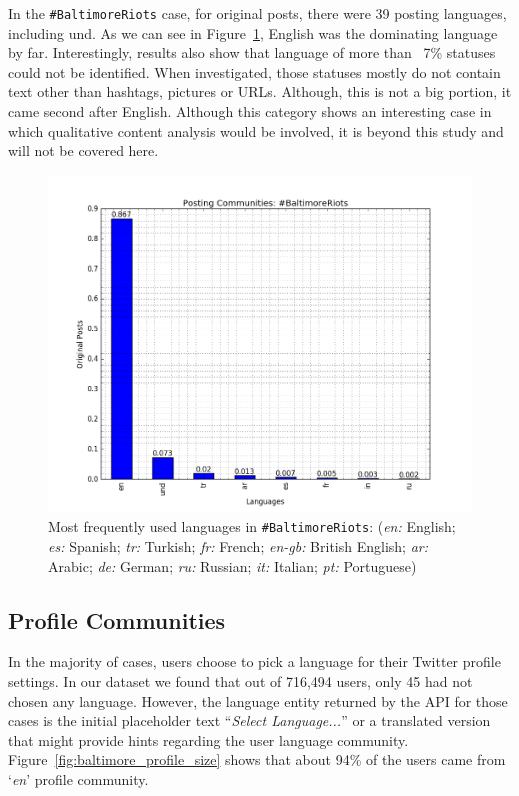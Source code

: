 In the {\texttt{\#BaltimoreRiots}} case, for original posts, there were 39 posting
languages, including und. As we can see in Figure~\ref{fig:baltimore_langfreq}, English was the
dominating language by far. Interestingly, results also show that
language of more than ~7\% statuses could not be
identified. When investigated, those statuses mostly do not contain
text other than hashtags, pictures or URLs. Although, this is not a
big portion, it came second after English. Although this category
shows an interesting case in which qualitative content analysis would
be involved, it is beyond this study and will not be covered here.

\begin{figure}[htb]
\centering
\includegraphics[width=\columnwidth]{images/baltimore_langfreq.png}
\caption{Most frequently used languages in
  {\texttt{\#BaltimoreRiots}}: 
({\emph{en:}} English; {\emph{es:}} Spanish; {\emph{tr:}} Turkish;
  {\emph{fr:}} French; {\emph{en-gb:}} British English; {\emph{ar:}}
  Arabic; {\emph{de:}} German; {\emph{ru:}} Russian; {\emph{it:}}
  Italian; {\emph{pt:}} Portuguese)}
\label{fig:baltimore_langfreq}
\end{figure}

\subsection{Profile Communities}

In the majority of cases, users choose to pick a language for their
Twitter profile settings. In our dataset we found that out of 716,494
users, only 45 had not chosen any language. However, the language
entity returned by the API for those cases is the initial placeholder
text ``{\emph{Select Language...}}'' or a translated version that might provide
hints regarding the user language
community. Figure~\ref{fig:baltimore_profile_size} shows that about 94\% of the
users came from `{\emph{en}}' profile community.

